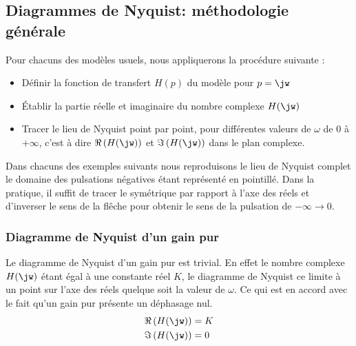 \subsection{Diagrammes de Nyquist: méthodologie générale}

Pour chacuns des modèles usuels, nous appliquerons la procédure suivante :
\begin{itemize}                                                                                                               
    \item Définir la fonction de transfert $H(p)$ du modèle pour $p=\jw$                                                      
    \item \'Etablir la partie réelle et imaginaire du nombre complexe $H(\jw)$                                          
    \item Tracer le lieu de Nyquist point par point, pour différentes valeurs de 
        $\omega$ de 0 à $+\infty$, c'est à dire $\Re\left(H(\jw)\right)$ 
          et $\Im\left(H(\jw)\right)$ dans le plan complexe.
\end{itemize}
Dans chacuns des exemples suivants nous reproduisons le lieu de Nyquist complet le domaine des pulsations
négatives étant représenté en pointillé. Dans la pratique, il suffit de tracer le symétrique par rapport à 
l'axe des réels et d'inverser le sens de la flêche pour obtenir le sens de la pulsation de $-\infty\to 0$. 
\newpage
\subsubsection{Diagramme de Nyquist d'un gain pur}
Le diagramme de Nyquist d'un gain pur est trivial. En effet le nombre complexe $H(\jw)$ étant égal 
à une constante réel $K$, le diagramme de Nyquist ce limite à un point sur l'axe des réels quelque soit la valeur de $\omega$.
Ce qui est en accord avec le fait qu'un gain pur présente un déphasage nul.
\begin{align*}
    \Re\left(H(\jw)\right)&=K\\
    \Im\left(H(\jw)\right)&=0\\
\end{align*}

